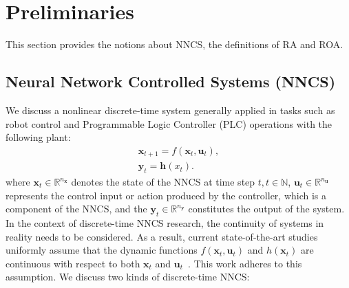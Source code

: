 \documentclass[conference]{IEEEtran}
\newcommand{\nncs}{\textsc{NNCS}\xspace}
\newcommand{\roa}{\textsc{ROA}\xspace}
\newcommand{\ra}{\textsc{RA}\xspace}
\newcommand{\myvec}[1]{\boldsymbol{#1}}
\newcommand{\bbR}{\mathbb{R}}
\newcommand{\bbN}{\mathbb{N}}
\begin{document}
\section{Preliminaries}\label{sec:pre}
This section provides the notions about \nncs, 
the definitions of \ra and \roa. 

\subsection{Neural Network Controlled Systems (\nncs)}
We discuss a nonlinear discrete-time system 
generally applied in tasks such as 
robot control and Programmable Logic 
Controller (PLC) operations 
\cite{vidal1988implementing,nubert2020safe} 
with the following plant:
\begin{subequations}
  \begin{align}
    \myvec{x}_{t+1} = f(\myvec{x}_{t},\myvec{u}_{t}), \label{eq:plant1} \\
    \myvec{y}_{t} = \myvec{h}(x_{t}). \label{eq:plant2}
  \end{align}
\end{subequations}
where $\myvec{x}_{t} \in \bbR^{n_{\myvec{x}}}$ denotes the state of the \nncs at time step $t, t\in \bbN$, 
$\myvec{u}_{t} \in \bbR^{n_{\myvec{u}}}$ represents 
the control input or action produced by the controller, 
which is a component of the \nncs, 
and the $\myvec{y}_{t} \in \bbR^{n_{\myvec{y}}}$ constitutes the output of the system. 
In the context of discrete-time \nncs research, 
the continuity of systems in reality needs to be considered. 
As a result, current state-of-the-art studies uniformly assume that the dynamic functions 
$f(\myvec{x}_{t},\myvec{u}_{t})$ and $h(\myvec{x}_{t})$
are continuous with respect to both 
$\myvec{x}_{t}$ and $\myvec{u}_{t}$~\cite{luenberger1971introduction,xue2020inner,meyn2022control}. 
This work adheres to this assumption. 
We discuss two kinds of 
discrete-time \nncs :
\end{document}
